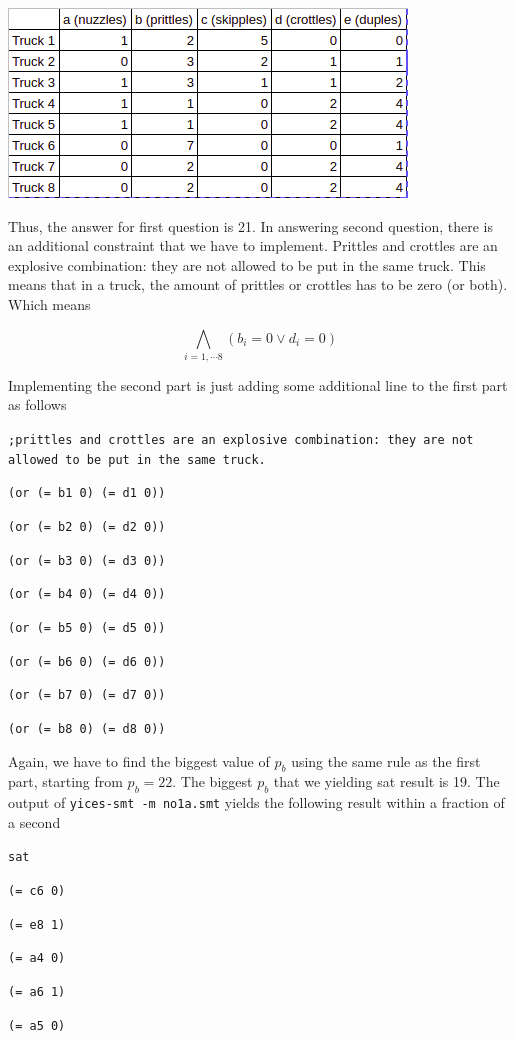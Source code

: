 \documentclass[12pt]{article}
\begin{document}
\includegraphics[scale=0.75, angle=0]{img/1a.png}

Thus, the answer for first question is 21. In answering second question, there is an additional constraint that we have to implement. Prittles and crottles are an explosive combination: they are not allowed to be put in the same truck. This means that in a truck, the amount of prittles or crottles has to be zero (or both). Which means

\[ \bigwedge_{i=1,\cdots 8}  (b_i=0 \vee d_i=0)  \]

Implementing the second part is just adding some additional line to the first part as follows

{ \footnotesize
{\tt ;prittles and crottles are an explosive combination: they are not allowed to be put in the same truck. }

{\tt (or (= b1 0) (= d1 0)) }

{\tt (or (= b2 0) (= d2 0)) }

{\tt (or (= b3 0) (= d3 0)) }

{\tt (or (= b4 0) (= d4 0)) }

{\tt (or (= b5 0) (= d5 0)) }

{\tt (or (= b6 0) (= d6 0)) }

{\tt (or (= b7 0) (= d7 0)) }

{\tt (or (= b8 0) (= d8 0)) }

}
Again, we have to find the biggest value of $p_b$ using the same rule as the first part, starting from $p_b=22$. The biggest $p_b$ that we yielding sat result is 19. The output of {\tt yices-smt -m no1a.smt} yields the following result within a fraction of a second


{\tt sat }

{\tt  }

{\tt (= c6 0) }

{\tt (= e8 1) }

{\tt (= a4 0) }

{\tt (= a6 1) }

{\tt (= a5 0) }
\end{document}
